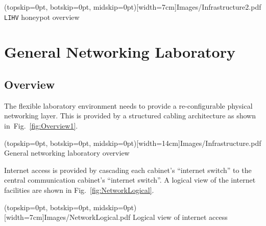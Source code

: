 \documentclass{ieeeaccess}
\begin{document}
\Figure[t!](topskip=0pt, botskip=0pt, midskip=0pt)[width=7cm]{Images/Infrastructure2.pdf}
{\texttt{LIHV} honeypot overview\label{fig:Overview2}}


\section{General Networking Laboratory}\label{sec:netlab}
\subsection{Overview}
The flexible laboratory environment needs to provide a re-configurable physical
networking layer. This is provided by a structured cabling architecture as
shown in~Fig.~\ref{fig:Overview1}. 

\Figure[t!](topskip=0pt, botskip=0pt, midskip=0pt)[width=14cm]{Images/Infrastructure.pdf}
{General networking laboratory overview\label{fig:Overview1}}


Internet access is provided by cascading each cabinet's ``internet switch'' to
the central communication cabinet's ``internet switch''. A logical view of the
internet facilities are shown in Fig.~\ref{fig:NetworkLogical}.

\Figure[t!](topskip=0pt, botskip=0pt, midskip=0pt)[width=7cm]{Images/NetworkLogical.pdf}
{Logical view of internet access\label{fig:NetworkLogical}}

\end{document}
